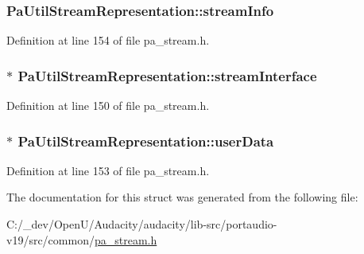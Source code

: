 \subsubsection[{\texorpdfstring{stream\+Info}{streamInfo}}]{ Pa\+Util\+Stream\+Representation\+::stream\+Info}\hypertarget{struct_pa_util_stream_representation_a13c2b5318f73dde9a11fd9d874763d4a}{}\label{struct_pa_util_stream_representation_a13c2b5318f73dde9a11fd9d874763d4a}


Definition at line 154 of file pa\+\_\+stream.\+h.

\subsubsection[{\texorpdfstring{stream\+Interface}{streamInterface}}]{$\ast$ Pa\+Util\+Stream\+Representation\+::stream\+Interface}\hypertarget{struct_pa_util_stream_representation_a08e6fbd36674c306fd09b981e6f9a898}{}\label{struct_pa_util_stream_representation_a08e6fbd36674c306fd09b981e6f9a898}


Definition at line 150 of file pa\+\_\+stream.\+h.

\subsubsection[{\texorpdfstring{user\+Data}{userData}}]{$\ast$ Pa\+Util\+Stream\+Representation\+::user\+Data}\hypertarget{struct_pa_util_stream_representation_a5d47c8cae02066d877bc7c670adb61ad}{}\label{struct_pa_util_stream_representation_a5d47c8cae02066d877bc7c670adb61ad}


Definition at line 153 of file pa\+\_\+stream.\+h.



The documentation for this struct was generated from the following file\+:\begin{DoxyCompactItemize}
\item 
C\+:/\+\_\+dev/\+Open\+U/\+Audacity/audacity/lib-\/src/portaudio-\/v19/src/common/\hyperlink{pa__stream_8h}{pa\+\_\+stream.\+h}\end{DoxyCompactItemize}
